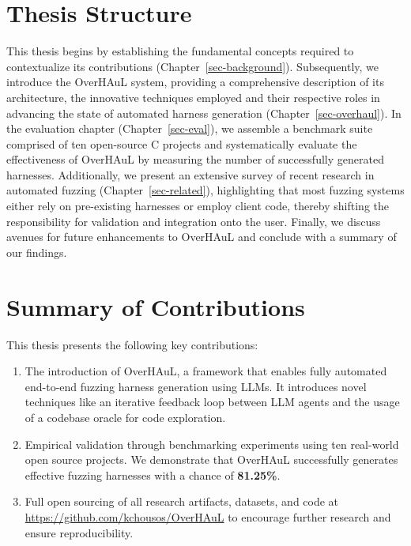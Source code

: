 \documentclass[
  a4paper,
]{scrreprt}
\providecommand{\tightlist}{%
  \setlength{\itemsep}{0pt}\setlength{\parskip}{0pt}}
\theoremstyle{definition}
\theoremstyle{remark}
\begin{document}
\section{Thesis Structure}\label{thesis-structure}

This thesis begins by establishing the fundamental concepts required to
contextualize its contributions (Chapter~\ref{sec-background}).
Subsequently, we introduce the OverHAuL system, providing a
comprehensive description of its architecture, the innovative techniques
employed and their respective roles in advancing the state of automated
harness generation (Chapter~\ref{sec-overhaul}). In the evaluation
chapter (Chapter~\ref{sec-eval}), we assemble a benchmark suite
comprised of ten open-source C projects and systematically evaluate the
effectiveness of OverHAuL by measuring the number of successfully
generated harnesses. Additionally, we present an extensive survey of
recent research in automated fuzzing (Chapter~\ref{sec-related}),
highlighting that most fuzzing systems either rely on pre-existing
harnesses or employ client code, thereby shifting the responsibility for
validation and integration onto the user. Finally, we discuss avenues
for future enhancements to OverHAuL and conclude with a summary of our
findings.

\section{Summary of Contributions}\label{summary-of-contributions}

This thesis presents the following key contributions:

\begin{enumerate}
\def\labelenumi{\arabic{enumi}.}
\tightlist
\item
  The introduction of OverHAuL, a framework that enables fully automated
  end-to-end fuzzing harness generation using LLMs. It introduces novel
  techniques like an iterative feedback loop between LLM agents and the
  usage of a codebase oracle for code exploration.
\item
  Empirical validation through benchmarking experiments using ten
  real-world open source projects. We demonstrate that OverHAuL
  successfully generates effective fuzzing harnesses with a chance of
  \textbf{81.25\%}.
\item
  Full open sourcing of all research artifacts, datasets, and code at
  \url{https://github.com/kchousos/OverHAuL} to encourage further
  research and ensure reproducibility.
\end{enumerate}
\end{document}

